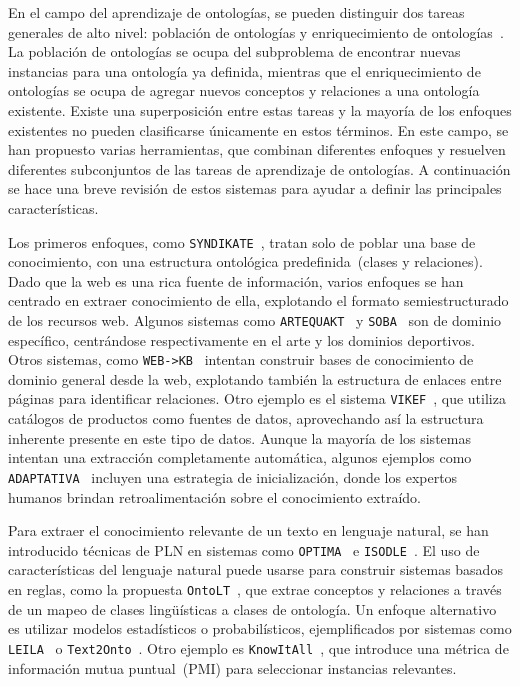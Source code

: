 En el campo del aprendizaje de ontologías, se pueden distinguir dos tareas generales de alto nivel: población de ontologías y enriquecimiento de ontologías~\cite{petasis2011ontology}.
La población de ontologías se ocupa del subproblema de encontrar nuevas instancias para una ontología ya definida, mientras que el enriquecimiento de ontologías se ocupa de agregar nuevos conceptos y relaciones a una ontología existente.
Existe una superposición entre estas tareas y la mayoría de los enfoques existentes no pueden clasificarse únicamente en estos términos.
En este campo, se han propuesto varias herramientas, que combinan diferentes enfoques y resuelven diferentes subconjuntos de las tareas de aprendizaje de ontologías.
A continuación se hace una breve revisión de estos sistemas para ayudar a definir las principales características.

Los primeros enfoques, como \texttt{SYNDIKATE}~\cite{syndikate}, tratan solo de poblar una base de conocimiento, con una estructura ontológica predefinida~(clases y relaciones).
Dado que la web es una rica fuente de información, varios enfoques se han centrado en extraer conocimiento de ella, explotando el formato semiestructurado de los recursos web.
Algunos sistemas como \texttt{ARTEQUAKT}~\cite{artequakt} y \texttt{SOBA}~\cite{soba} son de dominio específico, centrándose respectivamente en el arte y los dominios deportivos.
Otros sistemas, como \texttt{WEB->KB}~\cite{webkb} intentan construir bases de conocimiento de dominio general desde la web, explotando también la estructura de enlaces entre páginas para identificar relaciones.
Otro ejemplo es el sistema \texttt{VIKEF}~\cite{vikef}, que utiliza catálogos de productos como fuentes de datos, aprovechando así la estructura inherente presente en este tipo de datos.
Aunque la mayoría de los sistemas intentan una extracción completamente automática, algunos ejemplos como \texttt{ADAPTATIVA}~\cite{adaptativa} incluyen una estrategia de inicialización, donde los expertos humanos brindan retroalimentación sobre el conocimiento extraído.

Para extraer el conocimiento relevante de un texto en lenguaje natural, se han introducido técnicas de PLN en sistemas como \texttt{OPTIMA}~\cite{optima} e \texttt{ISODLE}~\cite{isolde}.
El uso de características del lenguaje natural puede usarse para construir sistemas basados en reglas, como la propuesta \texttt{OntoLT}~\cite{buitelaar2004ontolt}, que extrae conceptos y relaciones a través de un mapeo de clases lingüísticas a clases de ontología.
Un enfoque alternativo es utilizar modelos estadísticos o probabilísticos, ejemplificados por sistemas como \texttt{LEILA}~\cite{leila} o \texttt{Text2Onto}~\cite{cimiano2005text2onto}.
Otro ejemplo es \texttt{KnowItAll}~\cite{knowitall}, que introduce una métrica de información mutua puntual~(PMI) para seleccionar instancias relevantes.

